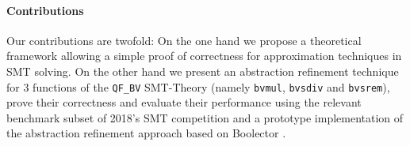 \paragraph{Contributions}
Our contributions are twofold:
On the one hand we propose a theoretical framework allowing a simple proof of correctness for approximation techniques in SMT solving.
On the other hand we present an abstraction refinement technique for 3 functions of the \texttt{QF\_BV} SMT-Theory (namely \texttt{bvmul}, \texttt{bvsdiv} and \texttt{bvsrem}), prove their correctness and evaluate their performance using the relevant benchmark subset of 2018's SMT competition \cite{SMTCOMP18} and a prototype implementation of the abstraction refinement approach based on Boolector \cite{NiemetzPreinerBiere-JSAT15}.